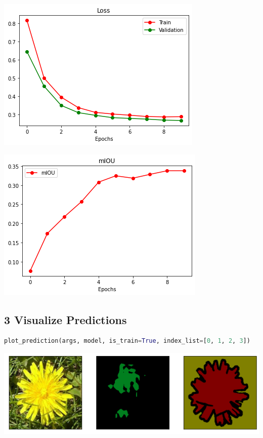 \documentclass{article}
\begin{document}
\includegraphics{D1-2.1.png}

\includegraphics{D1-2.2.png}



\subsection*{3 Visualize Predictions}

\begin{lstlisting}[language=Python]
plot_prediction(args, model, is_train=True, index_list=[0, 1, 2, 3])
\end{lstlisting}

\includegraphics[width=\textwidth]{D1-3.1.1.png}
\end{document}
